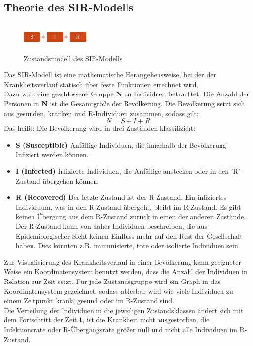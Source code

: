 \subsection*{Theorie des SIR-Modells}
\begin{figure}
\centering
\includegraphics[width= 0.3\textwidth]{./images/SIR-Modell.jpg}\caption{Zustandsmodell des SIR-Modells}
\end{figure}
Das SIR-Modell ist eine mathematische Herangehensweise, bei der der Krankheitsverlauf statisch über feste Funktionen errechnet wird. \\
Dazu wird eine geschlossene Gruppe \textbf{N} an Individuen betrachtet. Die Anzahl der Personen in \textbf{N} ist die Gesamtgröße der Bevölkerung. Die Bevölkerung setzt sich aus gesunden, kranken und \glqq R\grqq-Individuen zusammen, sodass gilt:
\begin{equation}
N = S + I + R
\end{equation}
Das heißt: Die Bevölkerung wird in drei Zuständen klassifiziert:
\begin{itemize}
\item \textbf{S (Susceptible)} Anfällige Individuen, die innerhalb der Bevölkerung Infiziert werden können.
\item \textbf{I (Infected)} Infizierte Individuen, die Anfällige anstecken  oder in den 'R'-Zustand übergehen können.
\item \textbf{R (Recovered)} Der letzte Zustand ist der \glqq R\grqq-Zustand. Ein infiziertes Individuum, was in den \glqq R\grqq -Zustand übergeht, bleibt im R-Zustand. Es gibt keinen Übergang aus dem R-Zustand zurück in einen der anderen Zustände. Der R-Zustand kann von daher Individuen beschreiben, die aus Epidemiologischer Sicht keinen Einfluss mehr auf den Rest der Gesellschaft haben. Dies könnten z.B. immunisierte, tote oder isolierte Individuen sein.
\end{itemize}
Zur Visualisierung des Krankheitsverlauf in einer Bevölkerung kann geeigneter Weise ein Koordinatensystem benutzt werden, dass die Anzahl der Individuen in Relation zur Zeit setzt.
Für jede Zustandsgruppe wird ein Graph in das Koordinatensystem gezeichnet, sodass ablesbar wird wie viele Individuen zu einem Zeitpunkt krank, gesund oder im \glqq R\grqq-Zustand sind.\\
Die Verteilung der Individuen in die jeweiligen Zustandsklassen ändert sich mit dem Fortschritt der Zeit \textbf{t}, ist die Krankheit nicht ausgestorben, die Infektionsrate oder \glqq R\grqq-Übergangsrate größer null und nicht alle Individuen im \glqq R\grqq-Zustand.
